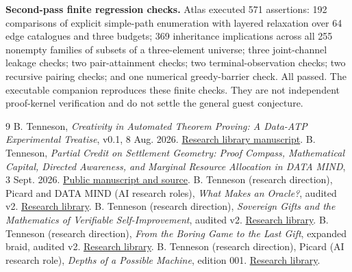 \documentclass[11pt]{article}
\theoremstyle{definition}\newtheorem{definition}[theorem]{Definition}\newtheorem{conjecture}[theorem]{Conjecture}\newtheorem{example}[theorem]{Example}
\begin{document}
\textbf{Second-pass finite regression checks.} Atlas executed 571 assertions: 192 comparisons of explicit simple-path enumeration with layered relaxation over 64 edge catalogues and three budgets; 369 inheritance implications across all 255 nonempty families of subsets of a three-element universe; three joint-channel leakage checks; two pair-attainment checks; two terminal-observation checks; two recursive pairing checks; and one numerical greedy-barrier check. All passed. The executable companion reproduces these finite checks. They are not independent proof-kernel verification and do not settle the general guest conjecture.
\begin{thebibliography}{9}\footnotesize\setlength{\itemsep}{1pt}\setlength{\parskip}{0pt}
 B. Tenneson, \emph{Creativity in Automated Theorem Proving: A Data-ATP Experimental Treatise}, v0.1, 8 Aug. 2026. \href{https://btenneson.github.io/Mathematics-of-certifiable-self-improvement/reader.html?id=55}{Research library manuscript}.
 B. Tenneson, \emph{Partial Credit on Settlement Geometry: Proof Compass, Mathematical Capital, Directed Awareness, and Marginal Resource Allocation in DATA MIND}, 3 Sept. 2026. \href{https://btenneson.github.io/pub/cs.LO_Logic_in_Computer_Science/partial_credit_on_settlement_geometry_data_mind/}{Public manuscript and source}.
 B. Tenneson (research direction), Picard and DATA MIND (AI research roles), \emph{What Makes an Oracle?}, audited v2. \href{https://btenneson.github.io/Mathematics-of-certifiable-self-improvement/what-makes-an-oracle.html}{Research library}.
 B. Tenneson (research direction), \emph{Sovereign Gifts and the Mathematics of Verifiable Self-Improvement}, audited v2. \href{https://btenneson.github.io/Mathematics-of-certifiable-self-improvement/reader.html?id=72}{Research library}.
 B. Tenneson (research direction), \emph{From the Boring Game to the Last Gift}, expanded braid, audited v2. \href{https://btenneson.github.io/Mathematics-of-certifiable-self-improvement/reader.html?id=76}{Research library}.
 B. Tenneson (research direction), Picard (AI research role), \emph{Depths of a Possible Machine}, edition 001. \href{https://btenneson.github.io/Mathematics-of-certifiable-self-improvement/picard-depths.html}{Research library}.
\end{thebibliography}
\end{document}

